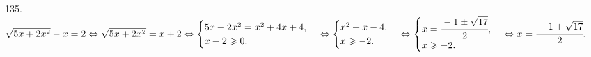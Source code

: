 135. $\sqrt{5x+2x^2}-x=2\Leftrightarrow\sqrt{5x+2x^2}=x+2\Leftrightarrow\begin{cases}5x+2x^2=x^2+4x+4,\\ x+2\geqslant0.\end{cases}
\Leftrightarrow\begin{cases}x^2+x-4,\\ x\geqslant-2.\end{cases}
\Leftrightarrow\begin{cases}x=\cfrac{-1\pm\sqrt{17}}{2},\\ x\geqslant-2.\end{cases}
\Leftrightarrow x=\cfrac{-1+\sqrt{17}}{2}.$\\
